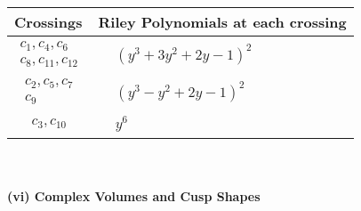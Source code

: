\documentclass[1p]{elsarticle_modified}
\theoremstyle{definition}
\begin{document}
\begin{tabular}{m{50pt}|m{274pt}}
Crossings & \hspace{64pt}Riley Polynomials at each crossing \\
\hline $$\begin{aligned}c_{1},c_{4},c_{6}\\c_{8},c_{11},c_{12}\end{aligned}$$&$\begin{aligned}
&(y^3+3 y^2+2 y-1)^2
\end{aligned}$\\
\hline $$\begin{aligned}c_{2},c_{5},c_{7}\\c_{9}\end{aligned}$$&$\begin{aligned}
&(y^3- y^2+2 y-1)^2
\end{aligned}$\\
\hline $$\begin{aligned}c_{3},c_{10}\end{aligned}$$&$\begin{aligned}
&y^6
\end{aligned}$\\
\hline
\end{tabular}\\~\\
\newpage\flushleft \textbf{(vi) Complex Volumes and Cusp Shapes}
\end{document}
